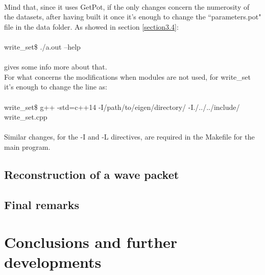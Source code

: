\documentclass[12pt, a4paper]{report}
\theoremstyle{definition}
\begin{document}
{{\\}
Mind that, since it uses GetPot, if the only changes concern the numerosity of the datasets, after having built it once it's enough to change the ``parameters.pot" file in the data folder. As showed in section \ref{section3.4}: \\
{\\ \ttfamily 
	write\_set\$ ./a.out --help\\
\\}
gives some info more about that.\\
\newline\noindent For what concerns the modifications when modules are not used, for write\_set it's enough to change the line as:\\
{\\ \ttfamily 
	write\_set\$ g++ -std=c++14 -I/path/to/eigen/directory/ -I./../../include/ write\_set.cpp\\
\\}
Similar changes, for the {\ttfamily -I} and {\ttfamily -L} directives, are required in the Makefile for the main program.

\section{Reconstruction of a wave packet}

\section{Final remarks} 



\chapter*{Conclusions and further developments}




}
\end{document}
